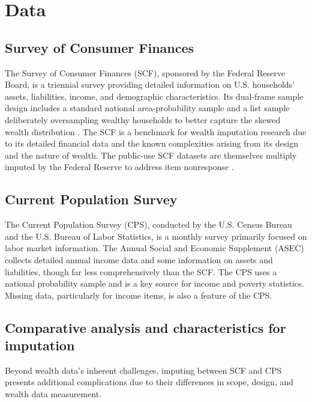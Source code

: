 \section{Data}\label{sec:data}

\subsection{Survey of Consumer Finances}

The Survey of Consumer Finances (SCF), sponsored by the Federal Reserve Board, is a triennial survey providing detailed information on U.S. households' assets, liabilities, income, and demographic characteristics. Its dual-frame sample design includes a standard national area-probability sample and a list sample deliberately oversampling wealthy households to better capture the skewed wealth distribution \citep{barcelo2006imputation}. The SCF is a benchmark for wealth imputation research due to its detailed financial data and the known complexities arising from its design and the nature of wealth. The public-use SCF datasets are themselves multiply imputed by the Federal Reserve to address item nonresponse \citep{barcelo2008impact}.

\subsection{Current Population Survey}

The Current Population Survey (CPS), conducted by the U.S. Census Bureau and the U.S. Bureau of Labor Statistics, is a monthly survey primarily focused on labor market information. The Annual Social and Economic Supplement (ASEC) collects detailed annual income data and some information on assets and liabilities, though far less comprehensively than the SCF. The CPS uses a national probability sample and is a key source for income and poverty statistics. Missing data, particularly for income items, is also a feature of the CPS.

\subsection{Comparative analysis and characteristics for imputation}

Beyond wealth data's inherent challenges, imputing between SCF and CPS presents additional complications due to their differences in scope, design, and wealth data measurement.

